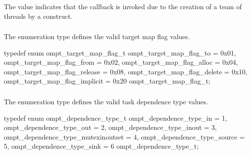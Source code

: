The value  indicates that the callback is invoked
due to the creation of a team of threads by a  construct.



\subsubsection{}
\label{sec:ompt_target_map_flag_t}

\summary
The  enumeration type defines the valid target 
map flag values.

\format
\begin{ccppspecific}
\begin{omptEnum}
typedef enum ompt_target_map_flag_t {
  ompt_target_map_flag_to             = 0x01,
  ompt_target_map_flag_from           = 0x02,
  ompt_target_map_flag_alloc          = 0x04,
  ompt_target_map_flag_release        = 0x08,
  ompt_target_map_flag_delete         = 0x10,
  ompt_target_map_flag_implicit       = 0x20
} ompt_target_map_flag_t;
\end{omptEnum}
\end{ccppspecific}



\subsubsection{}
\label{sec:ompt_dependence_type_t}

\summary
The  enumeration type defines the valid task dependence 
type values.

\format
\begin{ccppspecific}
\begin{omptEnum}
typedef enum ompt_dependence_type_t {
  ompt_dependence_type_in              = 1,
  ompt_dependence_type_out             = 2,
  ompt_dependence_type_inout           = 3,
  ompt_dependence_type_mutexinoutset   = 4,
  ompt_dependence_type_source          = 5,
  ompt_dependence_type_sink            = 6
} ompt_dependence_type_t;
\end{omptEnum}
\end{ccppspecific}



\subsubsection{}
\label{sec:ompt_cancel_flag_t}

